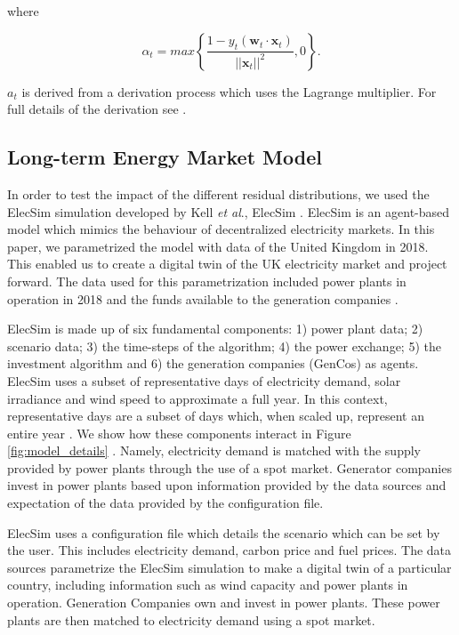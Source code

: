 \noindent where 

\begin{equation}
\alpha_t=max\left\{\frac{1-y_t(\boldsymbol{w}_t\cdot\boldsymbol{x}_t)}{\left|\left|\boldsymbol{x}_t\right|\right|^2},0\right\}. 	
\end{equation}

\noindent $a_t$ is derived from a derivation process which uses the Lagrange multiplier. For full details of the derivation see \cite{Gzik2014}.

\subsection{Long-term Energy Market Model}


In order to test the impact of the different residual distributions, we used the ElecSim simulation developed by Kell \textit{et al}., ElecSim \cite{Kell,Kell2020}. ElecSim is an agent-based model which mimics the behaviour of decentralized electricity markets. In this paper, we parametrized the model with data of the United Kingdom in 2018. This enabled us to create a digital twin of the UK electricity market and project forward. The data used for this parametrization included power plants in operation in 2018 and the funds available to the generation companies \cite{dukes_511, companies_house}.

ElecSim is made up of six fundamental components: 1) power plant data; 2) scenario data; 3) the time-steps of the algorithm; 4) the power exchange; 5) the investment algorithm and 6) the generation companies (GenCos) as agents. ElecSim uses a subset of representative days of electricity demand, solar irradiance and wind speed to approximate a full year. In this context, representative days are a subset of days which, when scaled up, represent an entire year \cite{Kell2020}. We show how these components interact in Figure \ref{fig:model_details} \cite{Kell}. Namely, electricity demand is matched with the supply provided by power plants through the use of a spot market. Generator companies invest in power plants based upon information provided by the data sources and expectation of the data provided by the configuration file. 



ElecSim uses a configuration file which details the scenario which can be set by the user. This includes electricity demand, carbon price and fuel prices. The data sources parametrize the ElecSim simulation to make a digital twin of a particular country, including information such as wind capacity and power plants in operation. Generation Companies own and invest in power plants. These power plants are then matched to electricity demand using a spot market.



